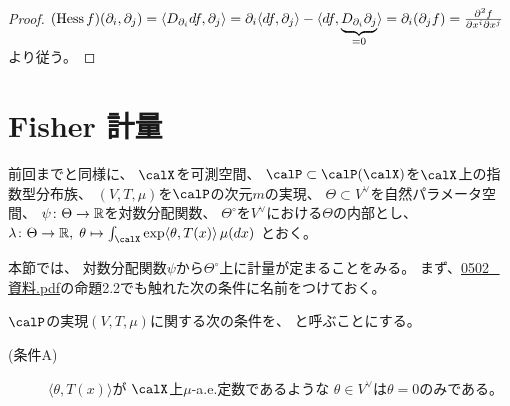 \documentclass[report]{jlreq}
\begin{document}

\begin{proof}
    $(\operatorname{Hess} f)(\partial_i, \partial_j)
        = \langle D_{\partial_i} df, \partial_j \rangle
        = \partial_i \langle df, \partial_j \rangle
            - \langle
                df,
                \underbrace{D_{\partial_i} \partial_j}_{= 0}
            \rangle
        = \partial_i (\partial_j f)
        = \frac{\partial^2 f}{\partial x^i \partial x^j}$
    より従う。
\end{proof}

%
\section{Fisher 計量}

前回までと同様に、
$\calX$を可測空間、
$\calP \subset \calP(\calX)$を$\calX$上の指数型分布族、
$(V, T, \mu)$を$\calP$の次元$m$の実現、
$\Theta \subset V^\vee$を自然パラメータ空間、
$\psi \colon \Theta \to \mathbb{R}$を対数分配関数、
$\Theta^\circ$を$V^\vee$における$\Theta$の内部とし、
$\lambda \colon \Theta \to \R, \;
    \theta
    \mapsto
    \int_\calX \exp \langle \theta, T(x) \rangle \, \mu(dx)$
とおく。

本節では、
対数分配関数$\psi$から$\Theta^\circ$上に計量が定まることをみる。
まず、\url{0502_資料.pdf}の命題2.2でも触れた次の条件に名前をつけておく。

\begin{definition}[条件A]
    $\calP$の実現$(V, T, \mu)$に関する次の条件を、
    と呼ぶことにする。
    \begin{description}
        \item[(条件A)] $\langle \theta, T(x) \rangle$が
            $\calX$上$\mu$-a.e.定数であるような
            $\theta \in V^\vee$は$\theta = 0$のみである。
    \end{description}
\end{definition}
\end{document}
